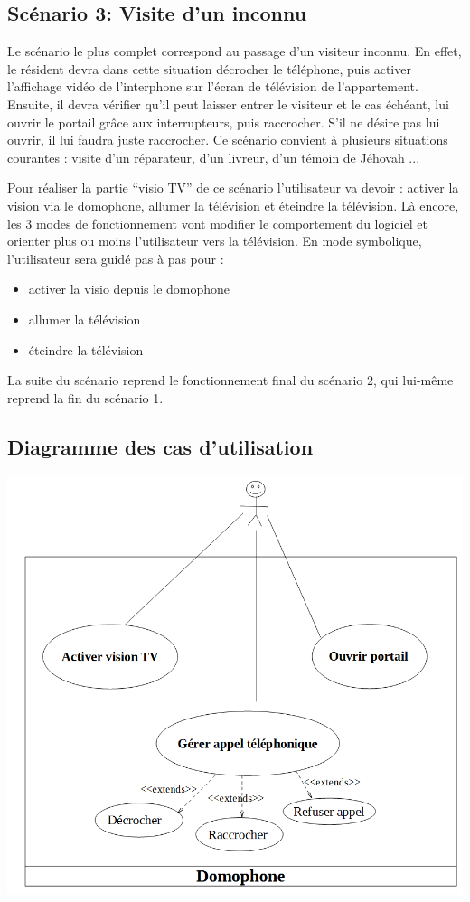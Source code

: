 \subsection{Scénario 3: Visite d'un inconnu}

Le scénario le plus complet correspond au passage d'un visiteur inconnu. En effet, le résident devra dans cette situation décrocher le téléphone, puis activer l'affichage vidéo de l'interphone sur l'écran de télévision de l'appartement. Ensuite, il devra vérifier qu'il peut laisser entrer le visiteur et le cas échéant, lui ouvrir le portail grâce aux interrupteurs, puis raccrocher. S'il ne désire pas lui ouvrir, il lui faudra juste raccrocher.
Ce scénario convient à plusieurs situations courantes : visite d'un réparateur, d'un livreur, d'un témoin de Jéhovah ...

Pour réaliser la partie "`visio TV"' de ce scénario l'utilisateur va devoir : activer la vision via le domophone, allumer la télévision et éteindre la télévision. Là encore, les 3 modes de fonctionnement vont modifier le comportement du logiciel et orienter plus ou moins l'utilisateur vers la télévision. En mode symbolique, l'utilisateur sera guidé pas à pas pour : 
\begin{itemize}
	\item activer la visio depuis le domophone
	\item allumer la télévision
	\item éteindre la télévision
\end{itemize}
La suite du scénario reprend le fonctionnement final du scénario 2, qui lui-même reprend la fin du scénario 1.

\subsection{Diagramme des cas d'utilisation}
\includegraphics[scale=0.5]{1-PreEtude/img/use_case_diag}
